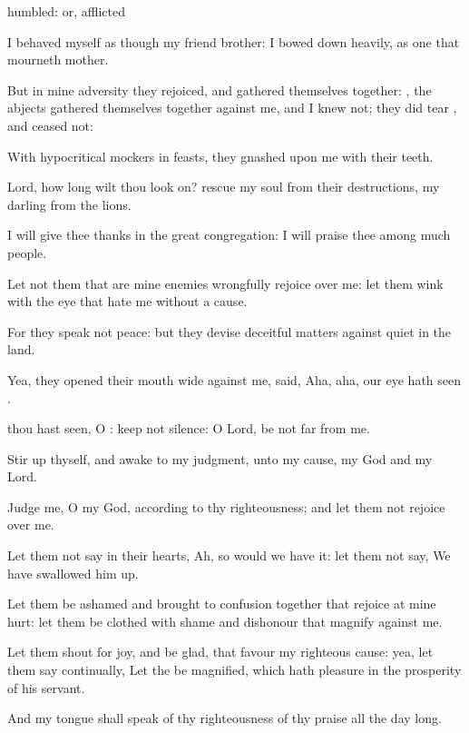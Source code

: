 {{humbled: or, afflicted}
\par }{\Q {}I
behaved myself as though
{} my
friend
{}
brother: I bowed
down
heavily, as one that
mourneth
{}
mother.
\par }{\Q {}But in mine
adversity they
rejoiced, and gathered themselves
together:
{}, the
abjects gathered themselves
together against me, and I
knew
{} not; they did
tear
{}, and
ceased not:
\par }{\Q {}With
hypocritical
mockers in
feasts, they
gnashed upon me with their
teeth.
\par }{\BB \par }{\Q {}Lord, how long wilt thou look
on?
rescue my
soul from their
destructions, my
darling from the
lions.
\par }{\Q {}I will give thee
thanks in the
great
congregation: I will
praise thee among
much
people.
\par }{\Q {}Let not them that are mine
enemies
wrongfully
rejoice over me:
{} let them
wink with the
eye that
hate me without a
cause.
\par }{\Q {}For they
speak not
peace: but they
devise
deceitful
matters against
{}
quiet in the
land.
\par }{\Q {}Yea, they opened their
mouth
wide against me,
{}
said,
Aha,
aha, our
eye hath
seen
{}.
\par }{\Q {} thou hast
seen, O
{}: keep not
silence: O
Lord, be not
far from me.
\par }{\Q {}Stir
up thyself, and
awake to my
judgment,
{} unto my
cause, my
God and my
Lord.
\par }{\Q {}Judge me, O
{} my
God, according to thy
righteousness; and let them not
rejoice over me.
\par }{\Q {}Let them not
say in their
hearts,
Ah, so would we have
it: let them not
say, We have swallowed him
up.
\par }{\Q {}Let them be
ashamed and brought to
confusion
together that
rejoice at mine
hurt: let them be
clothed with
shame and
dishonour that
magnify
{} against me.
\par }{\Q {}Let them shout for
joy, and be
glad, that
favour my righteous
cause: yea, let them
say
continually, Let the
{} be
magnified, which hath
pleasure in the
prosperity of his
servant.
\par }{\Q {}And my
tongue shall
speak of thy
righteousness
{} of thy
praise all the
day long.

}
